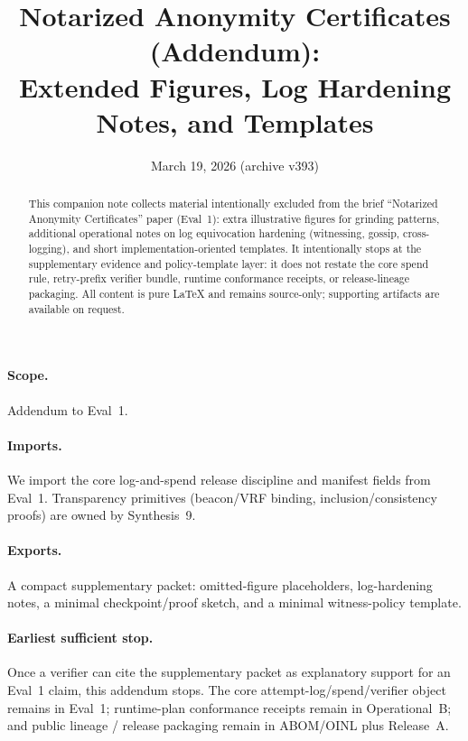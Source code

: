 \documentclass[11pt]{article}
\title{Notarized Anonymity Certificates (Addendum):\\Extended Figures, Log Hardening Notes, and Templates}
\author{}
\date{March 19, 2026 (archive v393)}
\begin{document}
\maketitle

\begin{abstract}
This companion note collects material intentionally excluded from the brief ``Notarized Anonymity Certificates'' paper (Eval~1):
extra illustrative figures for grinding patterns, additional operational notes on log equivocation hardening (witnessing, gossip, cross-logging),
and short implementation-oriented templates. It intentionally stops at the supplementary evidence and policy-template layer:
it does not restate the core spend rule, retry-prefix verifier bundle, runtime conformance receipts, or release-lineage packaging.
All content is pure \LaTeX{} and remains source-only; supporting artifacts are available on request.\cite{series:artifactpolicy}
\end{abstract}

\paragraph{Scope.}
Addendum to Eval~1.\cite{series:evalnotary}

\paragraph{Imports.}
We import the core log-and-spend release discipline and manifest fields from Eval~1.\cite{series:evalnotary}
Transparency primitives (beacon/VRF binding, inclusion/consistency proofs) are owned by Synthesis~9.\cite{series:transparencyprimitives}

\paragraph{Exports.}
A compact supplementary packet: omitted-figure placeholders, log-hardening notes, a minimal checkpoint/proof sketch, and a minimal witness-policy template.

\paragraph{Earliest sufficient stop.}
Once a verifier can cite the supplementary packet as explanatory support for an Eval~1 claim, this addendum stops.
The core attempt-log/spend/verifier object remains in Eval~1; runtime-plan conformance receipts remain in Operational~B; and public lineage / release packaging remain in ABOM/OINL plus Release~A.\cite{series:evalnotary,series:opB,series:abomoinl,series:releaseA}
\end{document}
